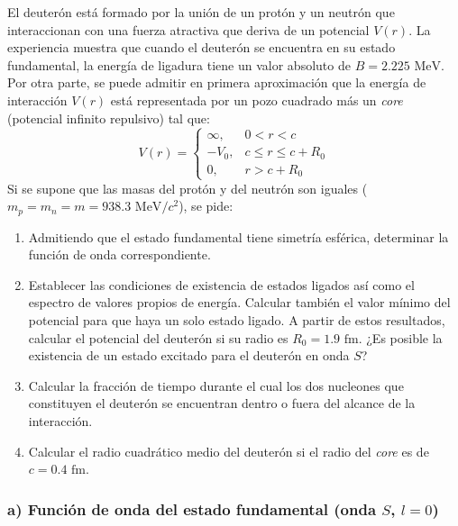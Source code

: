 \setcounter{problemacontador}{0}
\begin{problema}
El deuterón está formado por la unión de un protón y un neutrón que interaccionan con una fuerza atractiva que deriva de un potencial $V(r)$. La experiencia muestra que cuando el deuterón se encuentra en su estado fundamental, la energía de ligadura tiene un valor absoluto de $B = 2.225\text{ MeV}$. Por otra parte, se puede admitir en primera aproximación que la energía de interacción $V(r)$ está representada por un pozo cuadrado más un \textit{core} (potencial infinito repulsivo) tal que:
\begin{equation}
V(r) = 
\begin{cases}
\infty, & 0 < r < c \\
-V_0, & c \le r \le c + R_0 \\
0, & r > c + R_0
\end{cases}
\end{equation}
Si se supone que las masas del protón y del neutrón son iguales ($m_p = m_n = m = 938.3\text{ MeV}/c^2$), se pide:

\begin{enumerate}[label=\alph*)]
    \item Admitiendo que el estado fundamental tiene simetría esférica, determinar la función de onda correspondiente.
    \item Establecer las condiciones de existencia de estados ligados así como el espectro de valores propios de energía. Calcular también el valor mínimo del potencial para que haya un solo estado ligado. A partir de estos resultados, calcular el potencial del deuterón si su radio es $R_0 = 1.9\text{ fm}$. ¿Es posible la existencia de un estado excitado para el deuterón en onda $S$?
    \item Calcular la fracción de tiempo durante el cual los dos nucleones que constituyen el deuterón se encuentran dentro o fuera del alcance de la interacción.
    \item Calcular el radio cuadrático medio del deuterón si el radio del \textit{core} es de $c = 0.4\text{ fm}$.
\end{enumerate}

\tcblower

\subsubsection*{a) Función de onda del estado fundamental (onda $S$, $l=0$)}


\end{problema}
